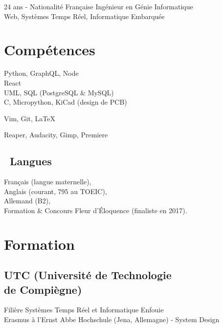 \documentclass[]{cv-template}
\begin{document}
%
%
{24 ans - Nationalité Française}
{Ingénieur en Génie Informatique \\Web, Systèmes Temps Réel, Informatique Embarquée}
{}

%
%
\begin{minipage}[t]{0.34\textwidth}

\section{Compétences}
Python, GraphQL, Node \\

React \\
UML, SQL (PostgreSQL \& MySQL)\\

C, Micropython, KiCad (design de PCB)

Vim, Git, \LaTeX

Reaper, Audacity, Gimp, Premiere

\sectionsep
\subsection{\ Langues}
Français (langue maternelle), \\
Anglais (courant, 795 au TOEIC), \\
Allemand (B2),\\

Formation \& Concours Fleur d'Éloquence (finaliste en 2017).
\sectionsep

\section{Formation}

\subsection[UTC (Université de Technologie de Compiègne)]{UTC (Université de Technologie\\ de Compiègne)}
Filière Systèmes Temps Réel et Informatique Enfouie\\
Erasmus à l'Ernst Abbe Hochschule (Jena, Allemagne) - System Design\\
\sectionsep


\end{minipage}
\end{document}
